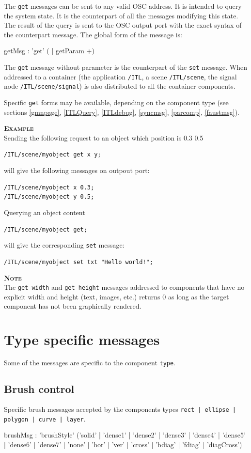 \documentclass[a4paper,twoside]{report}
\newcommand{\toplevel}[1]	{\chapter{#1}}
\newcommand{\sublevel}[1]	{\section{#1}}
\newcommand{\OSC}[1]		{\texttt{#1}}
\newcommand{\example}		{\textbf{\hspace{-1.5cm}\textbf{\textsc{Example }}}}
\newcommand{\note}	[1]		{\vspace{2mm}\textbf{\hspace{-1.03cm}\textbf{\textsc{Note #1}}}}
\newcommand{\sample}	[1]			{\vspace{-2mm}\begin{center}\colorbox{mygrey}{
								\begin{minipage}[t]{0.9\columnwidth} 
								{\small \texttt{#1}}
								\end{minipage}}\end{center}}
\newcommand{\sampleindent}	{ \hspace{0.5cm} }
\begin{document}
The \OSC{get} messages can be sent to any valid OSC address. It is intended to query the system state. It is the counterpart of all the messages modifying this state.  The result of the query is sent to the OSC output port with the exact syntax of the counterpart message. 
The global form of the message is:
\begin{rail}
getMsg : 'get' ( | getParam +)
\end{rail}

The \OSC{get} message without parameter is the counterpart of the \OSC{set} message. When addressed to a container (the application \OSC{/ITL}, a scene \OSC{/ITL/scene}, the signal node \OSC{/ITL/scene/signal}) is also distributed to all the container components.

Specific \OSC{get} forms may be available, depending on the component type (see sections \ref{gmnpage},  \ref{ITLQuery}, \ref{ITLdebug}, \ref{syncmsg}, \ref{parcomp}, \ref{faustmsg}).

\example \\
Sending the following request to an object which position is 0.3 0.5
\sample{/ITL/scene/myobject get x y;}
\sampleindent will give the following messages on outpout port:
\sample{/ITL/scene/myobject x 0.3; \\
/ITL/scene/myobject y 0.5;}
Querying an object content
\sample{/ITL/scene/myobject get;}
\sampleindent will give the corresponding \OSC{set} message:
\sample{/ITL/scene/myobject set txt "Hello world!";}

\note{} \\
The \OSC{get width} and \OSC{get height} messages addressed to components that have no explicit width and height (text, images, etc.) returns 0 as long as the target component has not been graphically rendered.


\toplevel{Type specific messages}
\label{specificMsg}
Some of the messages are specific to the component \OSC{type}.


\sublevel{Brush control}
\label{brush}
Specific brush messages accepted by the components types \OSC{rect | ellipse | polygon | curve |  layer}.
\begin{rail}
brushMsg : 	  'brushStyle' ('solid' | 'dense1' | 'dense2' | 'dense3' | 'dense4' | 'dense5' | 'dense6' | 'dense7' | 'none' | 'hor' | 'ver' | 'cross' | 'bdiag' | 'fdiag' | 'diagCross')
\end{rail}
\end{document}
